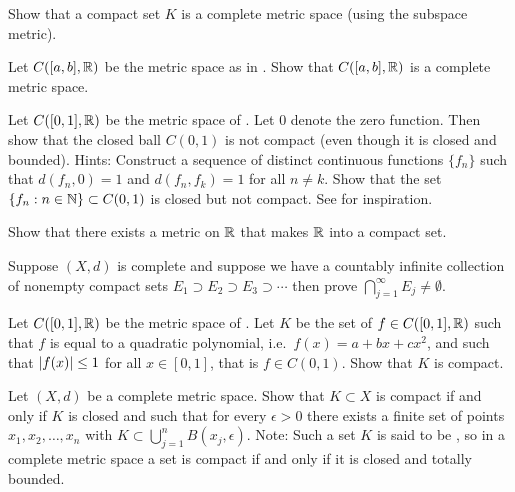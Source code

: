\begin{exercise}
Show that a compact set $K$ is a complete metric space (using the subspace
metric).
\end{exercise}

\begin{exercise} \label{exercise:CabRcomplete}
Let $C([a,b],{\mathbb{R}})$ be the metric space as in .  Show that
$C([a,b],{\mathbb{R}})$ is a complete metric space.
\end{exercise}

\begin{exercise}[Challenging] \label{exercise:msclbounnotcompt}
Let $C([0,1],{\mathbb{R}})$ be the metric space of .  Let $0$
denote the zero function.  Then show that the closed ball
$C(0,1)$ is not compact (even though it is closed and bounded).
Hints: Construct a sequence of distinct continuous functions $\{ f_n \}$ such that
$d(f_n,0) = 1$ and $d(f_n,f_k) = 1$ for all $n \not= k$.  Show that
the set $\{ f_n : n \in {\mathbb{N}} \} \subset C(0,1)$ is closed but not compact.
See  for inspiration.
\end{exercise}

\begin{exercise}[Challenging]
Show that there exists a metric on ${\mathbb{R}}$ that makes ${\mathbb{R}}$ into a compact set.
\end{exercise}

\begin{exercise}
Suppose $(X,d)$ is complete and suppose we have a countably infinite
collection of nonempty compact sets $E_1 \supset E_2 \supset E_3 \supset
\cdots$ then prove $\bigcap_{j=1}^\infty E_j \not= \emptyset$.
\end{exercise}

\begin{exercise}[Challenging]
Let $C([0,1],{\mathbb{R}})$ be the metric space of .
Let $K$ be the set of $f \in C([0,1],{\mathbb{R}})$ such that
$f$ is equal to a quadratic polynomial, i.e.\ $f(x) = a+bx+cx^2$, and such that
$\left\lvert {f(x)} \right\rvert \leq 1$ for all $x \in [0,1]$,
that is $f \in C(0,1)$.  Show that $K$ is compact.
\end{exercise}

\begin{exercise}[Challenging] \label{exercise:mstotbound}
Let $(X,d)$ be a complete metric space.
Show that $K \subset X$ is compact if and only if $K$ is closed
and such that for every $\epsilon > 0$
there exists a finite set of points $x_1,x_2,\ldots,x_n$ with
$K \subset \bigcup_{j=1}^n B(x_j,\epsilon)$.
Note: Such a set $K$ is said to be \emph{},
so in a complete metric space a set is compact if and only
if it is closed and totally bounded.
\end{exercise}


